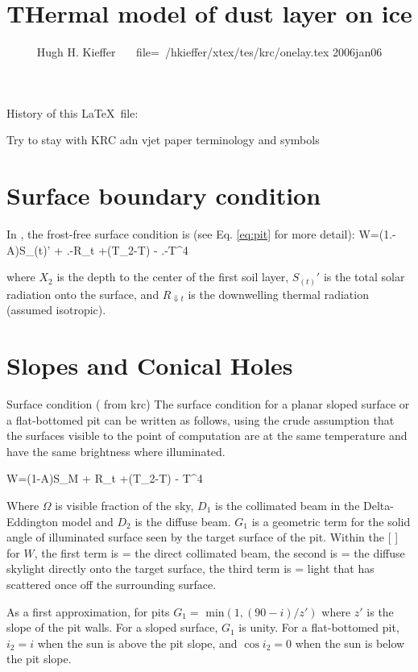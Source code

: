 \documentclass{article}
\title{THermal model of dust layer on ice}
\author{Hugh H. Kieffer \ \ \ file=~/hkieffer/xtex/tes/krc/onelay.tex 2006jan06}
\begin{document}
\maketitle

History of this \LaTeX ~file:


Try to stay with KRC adn vjet paper terminology and symbols

\section{Surface boundary condition} %
In , the frost-free surface condition is (see Eq. \ref{eq:pit} for
more detail):
\qbn W=(1.-A)S_{(t)}'  + .-\alpha \qr \epsilon R_{\Downarrow t}
+(T_2-T) - .-\alpha \qr \epsilon\sigma T^4 \qen

where $X_2$ is the depth to the center of the first soil layer, $S_{(t)}'$ is
the total solar radiation onto the surface, and $ R_{\Downarrow t}$ is the
downwelling thermal radiation (assumed isotropic).

\section{Slopes and Conical Holes } %

Surface condition ( from krc)
 The surface condition for a planar sloped surface or a flat-bottomed pit can be
 written as follows, using the crude assumption that the surfaces visible to the
 point of computation are at the same temperature and have the same brightness
 where illuminated.

\qbn W=(1-A)S_M   +  \Omega \epsilon R_{\Downarrow t}
+(T_2-T) -  \Omega \epsilon\sigma T^4 \label{eq:pit}\qen

Where $\Omega$ is visible fraction of the sky, $D_1$ is the collimated beam in
the Delta-Eddington model and $D_2$ is the diffuse beam. $G_1$ is a geometric
term for the solid angle of illuminated surface seen by the target surface of
the pit. Within the [ ] for $W$, 
\qi the first term is  = the direct collimated beam,
\qi the second is  = the diffuse skylight directly onto the target
surface,
\qi the third term is  = light that has scattered once off the
surrounding surface.

As a first approximation, for pits $G_1=$ min$( 1, (90-i)/z')$ where $z'$ is the
slope of the pit walls. For a sloped surface, $G_1$ is unity. For a
flat-bottomed pit, $i_2 = i$ when the sun is above the pit slope, and $ \cos i_2
=0$ when the sun is below the pit slope.
\end{document}
